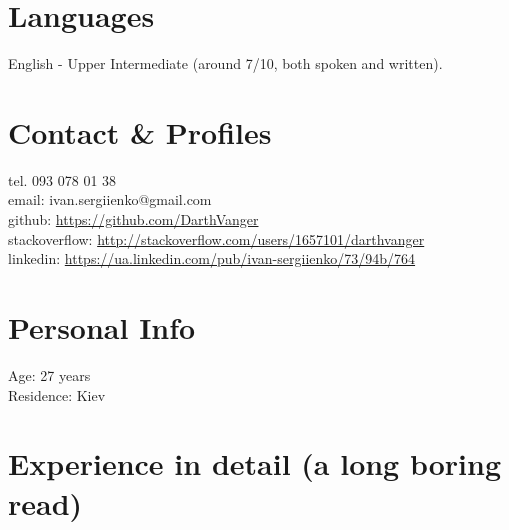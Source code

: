 \documentclass[a4paper, 14pt]{article}
\begin{document}
\section{Languages}
	English - Upper Intermediate (around 7/10, both spoken and written).
\section{Contact \& Profiles}
	tel. 093 078 01 38 \\
	email: ivan.sergiienko@gmail.com \\
    github: \url{https://github.com/DarthVanger} \\
    stackoverflow: \url{http://stackoverflow.com/users/1657101/darthvanger} \\
    linkedin: \url{https://ua.linkedin.com/pub/ivan-sergiienko/73/94b/764}
\section{Personal Info}
	Age: 27 years \\
	Residence: Kiev

\section{Experience in detail (a long boring read)}
\end{document}
